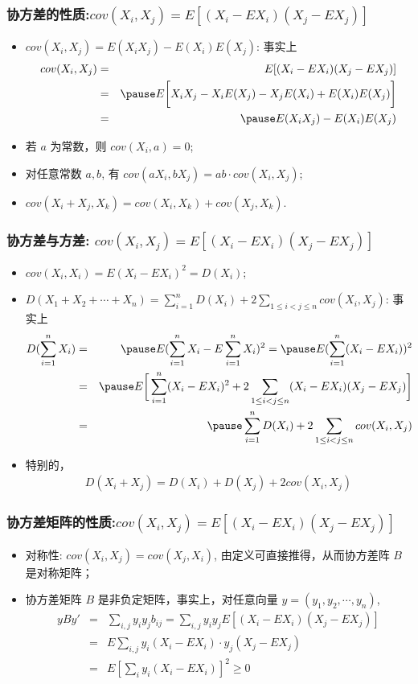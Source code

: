 \documentclass[Prob-All.tex]{subfiles}
\begin{document}
\begin{frame}
	\frametitle{协方差的性质:$cov (X_i,X_j)=E[(X_i-EX_i)(X_j-EX_j)]$}
	\begin{itemize}[<+-|alert@+>]
		\item $cov (X_i,X_j)=E (X_iX_j)-E (X_i) E (X_j)$: 事实上 \pause
		\begin{eqnarray*}
			cov(X_i,X_j)&=&E[(X_i-EX_i)(X_j-EX_j)]\\
			&=&\pause E\bigg[X_iX_j-X_iE(X_j)-X_jE(X_i)+E(X_i)E(X_j)\bigg]\\
			&=&\pause E(X_iX_j)-E(X_i)E(X_j)
		\end{eqnarray*}
		\item 若 $a$ 为常数，则 $cov (X_i,a)=0$;
		\item 对任意常数 $a,b$, 有 $cov (aX_i,bX_j)=ab\cdot  cov (X_i,X_j)$;
		\item $cov(X_i+X_j, X_k)=cov(X_i,X_k)+cov(X_j,X_k)$.

	\end{itemize}
\end{frame}
\begin{frame}
	\frametitle{协方差与方差: $cov (X_i,X_j)=E[(X_i-EX_i)(X_j-EX_j)]$}
	\begin{itemize}[<+-|alert@+>]
		\item $cov(X_i,X_i)=E(X_i-EX_i)^2=D(X_i)$;
		\item $D (X_1+X_2+\cdots+X_n)=\sum_{i=1}^nD (X_i)+2\sum_{1\le i<j\le n} cov (X_i,X_j)$: 事实上 \pause
		\begin{eqnarray*}
			D(\sum_{i=1}^nX_i)&=&\pause E(\sum_{i=1}^nX_i-E\sum_{i=1}^nX_i)^2=\pause E(\sum_{i=1}^n(X_i-EX_i))^2\\
			&=&\pause E\bigg[\sum_{i=1}^n(X_i-EX_i)^2+2\sum_{1\le i<j\le n}(X_i-EX_i)(X_j-EX_j)\bigg]\\
			&=&\pause \sum_{i=1}^nD(X_i)+2\sum_{1\le i<j\le n}cov(X_i,X_j)
		\end{eqnarray*}
		\item 特别的，
		\begin{eqnarray*}
			D(X_i+X_j)=D(X_i)+D(X_j)+2cov(X_i,X_j)
		\end{eqnarray*}


	\end{itemize}
\end{frame}
\begin{frame}
	\frametitle{协方差矩阵的性质:$cov (X_i,X_j)=E[(X_i-EX_i)(X_j-EX_j)]$}
	\begin{itemize}
		\item 对称性: $cov (X_i,X_j)=cov (X_j,X_i)$, 由定义可直接推得，从而协方差阵 $B$ 是对称矩阵；
		\item 协方差矩阵 $B$ 是非负定矩阵，事实上，对任意向量 $y=(y_1,y_2,\cdots,y_n)$,
		\begin{eqnarray*}
			yBy'&=&\sum_{i,j}y_iy_jb_{ij}=\sum_{i,j}y_iy_jE[(X_i-EX_i)(X_j-EX_j)]\\
			&=&E\sum_{i,j}y_i(X_i-EX_i)\cdot y_j(X_j-EX_j)\\
			&=&E[\sum_{i}y_i(X_i-EX_i)]^2\ge 0
		\end{eqnarray*}

	\end{itemize}
\end{frame}
\end{document}
